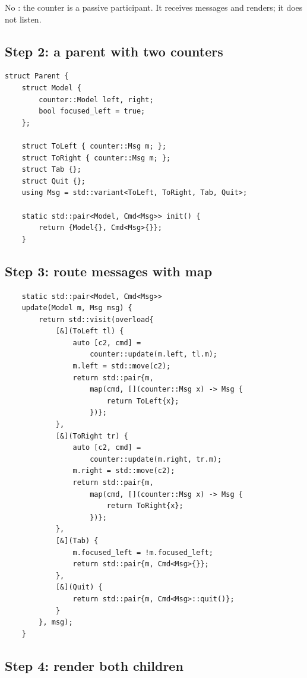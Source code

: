 No : the counter is a passive participant. It
receives messages and renders; it does not listen.

\subsection*{Step 2: a parent with two counters}

\begin{lstlisting}
struct Parent {
    struct Model {
        counter::Model left, right;
        bool focused_left = true;
    };

    struct ToLeft { counter::Msg m; };
    struct ToRight { counter::Msg m; };
    struct Tab {};
    struct Quit {};
    using Msg = std::variant<ToLeft, ToRight, Tab, Quit>;

    static std::pair<Model, Cmd<Msg>> init() {
        return {Model{}, Cmd<Msg>{}};
    }
\end{lstlisting}

\subsection*{Step 3: route messages with map}

\begin{lstlisting}
    static std::pair<Model, Cmd<Msg>>
    update(Model m, Msg msg) {
        return std::visit(overload{
            [&](ToLeft tl) {
                auto [c2, cmd] =
                    counter::update(m.left, tl.m);
                m.left = std::move(c2);
                return std::pair{m,
                    map(cmd, [](counter::Msg x) -> Msg {
                        return ToLeft{x};
                    })};
            },
            [&](ToRight tr) {
                auto [c2, cmd] =
                    counter::update(m.right, tr.m);
                m.right = std::move(c2);
                return std::pair{m,
                    map(cmd, [](counter::Msg x) -> Msg {
                        return ToRight{x};
                    })};
            },
            [&](Tab) {
                m.focused_left = !m.focused_left;
                return std::pair{m, Cmd<Msg>{}};
            },
            [&](Quit) {
                return std::pair{m, Cmd<Msg>::quit()};
            }
        }, msg);
    }
\end{lstlisting}

\subsection*{Step 4: render both children}

